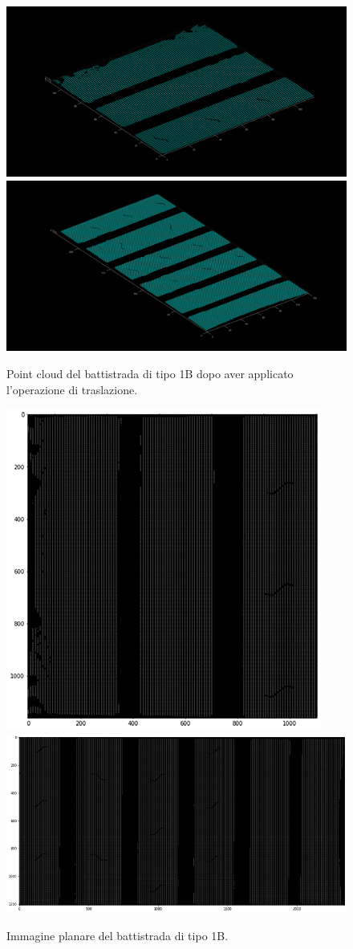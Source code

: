 \begin{figure}[H]
	\centering
	\includegraphics[width=0.45\columnwidth]{./pictures/batt_1b_analisi_1_5.png}
	\includegraphics[width=0.45\columnwidth]{./pictures/batt_1b_analisi_2_5.png}
	\caption{Point cloud del battistrada di tipo 1B dopo aver applicato l'operazione di traslazione.}\label{fig:batt_1b_analisi_5}
\end{figure}

\begin{figure}[H]
	\centering
	\includegraphics[height=0.32\columnwidth]{./pictures/batt_1b_analisi_1_6.png}
	\includegraphics[height=0.32\columnwidth]{./pictures/batt_1b_analisi_2_6.png}
	\caption{Immagine planare del battistrada di tipo 1B.}\label{fig:batt_1b_analisi_6}
\end{figure}


